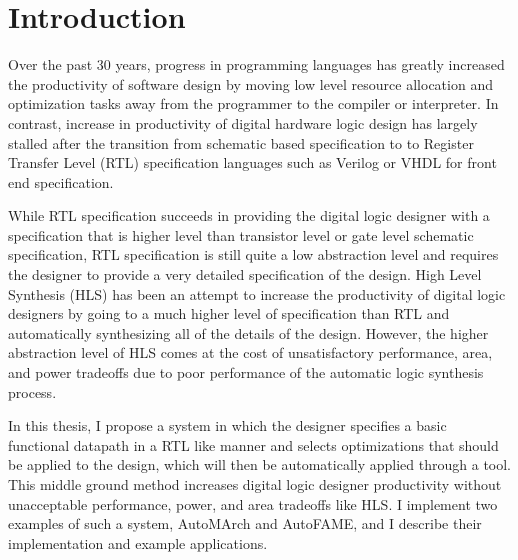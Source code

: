 \section{Introduction}
Over the past 30 years, progress in programming languages has greatly increased the productivity of software design by moving low level resource allocation and optimization tasks away from the programmer to the compiler or interpreter.  In contrast, increase in productivity of digital hardware logic design has largely stalled after the transition from schematic based specification to to Register Transfer Level (RTL) specification languages such as Verilog or VHDL for front end specification.

While RTL specification succeeds in providing the digital logic designer with a specification that is higher level than transistor level or gate level schematic specification, RTL specification is still quite a low abstraction level and requires the designer to provide a very detailed specification of the design. High Level Synthesis (HLS) has been an attempt to increase the productivity of digital logic designers by going to a much higher level of specification than RTL and automatically synthesizing all of the details of the design. However, the higher abstraction level of HLS comes at the cost of unsatisfactory performance, area, and power tradeoffs due to poor performance of the automatic logic synthesis process.

In this thesis, I propose a system in which the designer specifies a basic functional datapath in a RTL like manner and selects optimizations that should be applied to the design, which will then be automatically applied through a tool. This middle ground method increases digital logic designer productivity without unacceptable performance, power, and area tradeoffs like HLS. I implement two examples of such a system, AutoMArch and AutoFAME, and I describe their implementation and example applications.

